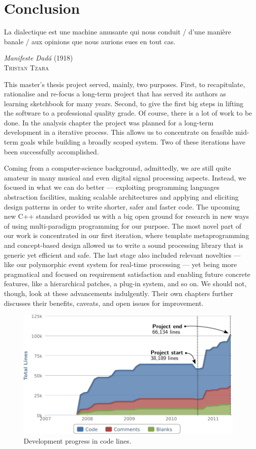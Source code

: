 \chapter{Conclusion}
\epigraph{La dialectique est une machine amusante qui nous conduit /
  d'une manière banale / aux opinions que nous aurions eues en tout
  cas.}{\emph{Manifeste Dadá} (1918)\\\textsc{Tristan Tzara}}

This master's thesis project served, mainly, two purposes. First, to
recapitulate, rationalise and re-focus a long-term project that has
served its authors as learning sketchbook for many years. Second, to
give the first big steps in lifting the software to a professional
quality grade. Of course, there is a lot of work to be done. In the
analysis chapter the project was planned for a long-term development
in a iterative process. This allows us to concentrate on feasible
mid-term goals while building a broadly scoped system. Two of these
iterations have been successfully accomplished. 

Coming from a computer-science background, admittedly, we are still
quite amateur in many musical and even digital signal processing
aspects. Instead, we focused in what we can do better --- exploiting
programming languages abstraction facilities, making scalable
architectures and applying and eliciting design patterns in order to
write shorter, safer and faster code. The upcoming new C++ standard
provided us with a big open ground for research in new ways of using
multi-paradigm programming for our purpose. The most novel part of our
work is concentrated in our first iteration, where template
metaprogramming and concept-based design allowed us to write a sound
processing library that is generic yet efficient and safe. The last
stage also included relevant novelties --- like our polymorphic event
system for real-time processing --- yet being more pragmatical and
focused on requirement satisfaction and enabling future concrete
features, like a hierarchical patches, a plug-in system, and so on. We
should not, though, look at these advancements indulgently. Their own
chapters further discusses their benefits, caveats, and open issues
for improvement.

\begin{figure}[h!]
  \centering
  \includegraphics[width=\textwidth]{pic/dev-progress.pdf}
  \caption{Development progress in code lines.}
  \label{fig:dev-progress}
\end{figure}

